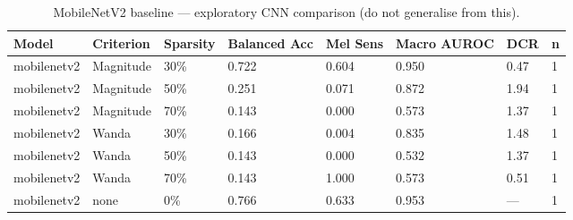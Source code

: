 \begin{table}[t]
\centering
\small
\begin{tabular}{llllllll}
\toprule
Model & Criterion & Sparsity & Balanced Acc & Mel Sens & Macro AUROC & DCR & n \\
\midrule
mobilenetv2 & Magnitude & 30\% & 0.722 & 0.604 & 0.950 & 0.47 & 1 \\
mobilenetv2 & Magnitude & 50\% & 0.251 & 0.071 & 0.872 & 1.94 & 1 \\
mobilenetv2 & Magnitude & 70\% & 0.143 & 0.000 & 0.573 & 1.37 & 1 \\
mobilenetv2 & Wanda & 30\% & 0.166 & 0.004 & 0.835 & 1.48 & 1 \\
mobilenetv2 & Wanda & 50\% & 0.143 & 0.000 & 0.532 & 1.37 & 1 \\
mobilenetv2 & Wanda & 70\% & 0.143 & 1.000 & 0.573 & 0.51 & 1 \\
mobilenetv2 & none & 0\% & 0.766 & 0.633 & 0.953 & — & 1 \\
\bottomrule
\end{tabular}
\caption{MobileNetV2 baseline — exploratory CNN comparison (do not generalise from this).}
\label{tab:mobilenetv2}
\end{table}